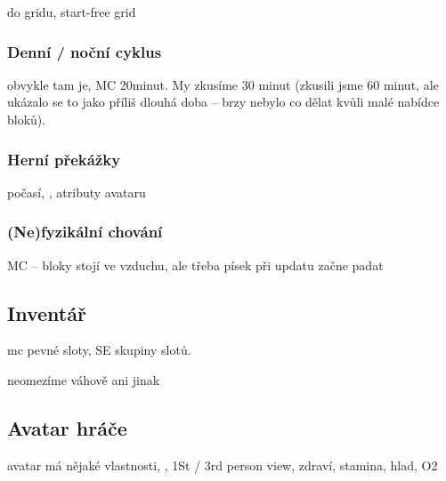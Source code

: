 do gridu, start-free grid


\subsubsection{Denní / noční cyklus}

obvykle tam je, MC 20minut. My zkusíme 30 minut (zkusili jsme 60 minut, ale ukázalo se to jako příliš dlouhá doba -- brzy nebylo co dělat kvůli malé nabídce bloků).

\subsubsection{Herní překážky}

počasí, \NPC{}, atributy avataru

\subsubsection{(Ne)fyzikální chování}

MC -- bloky stojí ve vzduchu, ale třeba písek při updatu začne padat

\subsection{Inventář}

mc pevné sloty, SE skupiny slotů.

neomezíme váhově ani jinak 

\subsection{Avatar hráče}
avatar má nějaké vlastnosti, \HUD{}, 1St / 3rd person view, zdraví, stamina, hlad, O2



